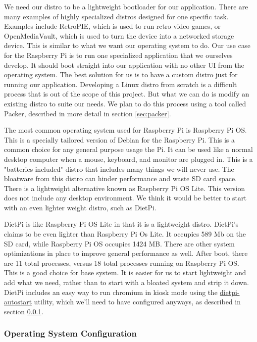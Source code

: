 We need our distro to be a lightweight bootloader for our application. There are many
examples of highly specialized distros designed for one specific task. Examples
include RetroPIE, which is used to run retro video games, or OpenMediaVault, which is used
to turn the device into a networked storage device. This is similar to what we want our
operating system to do. Our use case for the Raspberry Pi is to run one specialized
application that we ourselves develop. It should boot straight into our application with
no other UI from the operating system. The best solution for us is to have a custom distro
just for running our application. Developing a Linux distro from scratch is a difficult
process that is out of the scope of this project. But what we can do is modify an existing
distro to suite our needs. We plan to do this process using a tool called Packer,
described in more detail in section \ref{sec:packer}.

The most common operating system used for Raspberry Pi is Raspberry Pi OS. This is a
specially tailored version of Debian for the Raspberry Pi. This is a common choice for any
general purpose usage the Pi. It can be used like a normal desktop computer when a mouse,
keyboard, and monitor are plugged in. This is a "batteries included" distro that includes
many things we will never use. The bloatware from this distro can hinder performance and
waste SD card space. There is a lightweight alternative known as Raspberry Pi OS Lite.
This version does not include any desktop environment. We think it would be better to
start with an even lighter weight distro, such as DietPi.

DietPi is like Raspberry Pi OS Lite in that it is a lightweight distro. DietPi's claims to
be even lighter than Raspberry Pi Os Lite. It occupies 589 Mb on the SD card, while
Raspberry Pi OS occupies 1424 MB. There are other system optimizations in place to improve
general performance as well. After boot, there are 11 total processes, versus 18 total
processes running on Raspberry Pi OS. This is a good choice for base system. It is easier
for us to start lightweight and add what we need, rather than to start with a bloated
system and strip it down. DietPi includes an easy way to run chromium in kiosk mode using
the \url{dietpi-autostart} utility, which we'll need to have configured anyways, as
described in section \ref{sec:research:subsec:os_config}.


\subsubsection{Operating System Configuration}
\label{sec:research:subsec:os_config}

